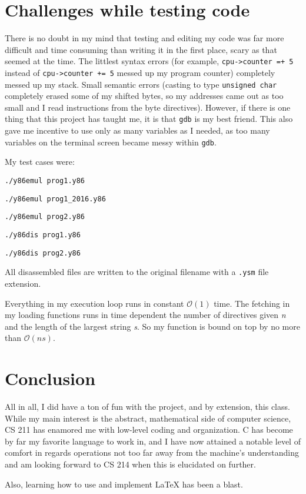 \documentclass{article}
\begin{document}
\section{Challenges while testing code}
There is no doubt in my mind that testing and editing my code was far more difficult and time consuming than writing it in the
first place, scary as that seemed at the time.  The littlest syntax errors (for example, \verb#cpu->counter =+ 5# instead of
\verb#cpu->counter += 5# messed up my program counter) completely messed up my stack.  Small semantic errors (casting to
type \verb#unsigned char# completely erased some of my shifted bytes, so my addresses came out as too small and I read
instructions from the byte directives).  However, if there is one thing that this project has taught me, it is that \verb#gdb# is
my best friend.  This also gave me incentive to use only as many variables as I needed, as too many variables on the terminal
screen became messy within \verb#gdb#. 

My test cases were:

\verb#./y86emul prog1.y86#

\verb#./y86emul prog1_2016.y86#

\verb#./y86emul prog2.y86#

\verb#./y86dis prog1.y86#

\verb#./y86dis prog2.y86#

All disassembled files are written to the original filename with a \verb#.ysm# file extension.


Everything in my execution loop runs in constant $\mathcal{O}(1)$ time.  The fetching in my loading functions runs in time
dependent the number of directives given \textit{n} and the length of the largest string \textit{s}.  So my function is bound on
top by no more than $\mathcal{O}(ns)$.


\section{Conclusion}
All in all, I did have a ton of fun with the project, and by extension, this class.  While my main interest is the abstract,
mathematical side of computer science, CS 211 has enamored me with low-level coding and organization.  C has become by far my
favorite language to work in, and I have now attained a notable level of comfort in regards operations not too far away from the
machine's understanding and am looking forward to CS 214 when this is elucidated on further.

Also, learning how to use and implement \LaTeX{} has been a blast.
\end{document}
